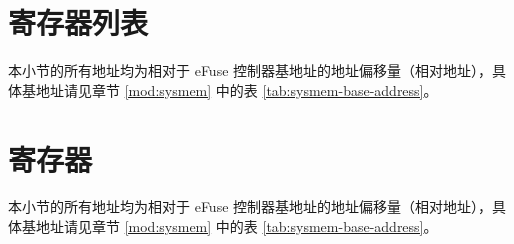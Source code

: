 \documentclass[main\_\_CN.tex]{subfiles}
\begin{document}
\newpage
\section{寄存器列表}
\label{sec:efuse-reg-summ}
\hypertarget{efuse-reg-summ}{}

本小节的所有地址均为相对于 eFuse 控制器基地址的地址偏移量（相对地址），具体基地址请见章节 \ref{mod:sysmem} \textit{} 中的表 \ref{tab:sysmem-base-address}。





\newpage
\section{寄存器}

本小节的所有地址均为相对于 eFuse 控制器基地址的地址偏移量（相对地址），具体基地址请见章节 \ref{mod:sysmem} \textit{} 中的表 \ref{tab:sysmem-base-address}。


\end{document}
